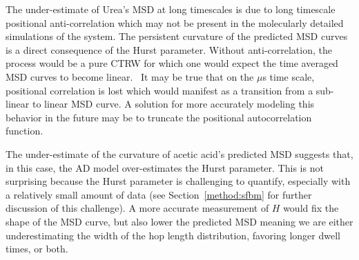 \documentclass{article}
\begin{document}
  The under-estimate of Urea's MSD at long timescales is due to long timescale
  positional anti-correlation which may not be present in the 
  molecularly detailed simulations of the 
  system. The 
  persistent curvature of the predicted MSD curves is a direct consequence of 
  the Hurst parameter. Without anti-correlation, the process would be 
  a pure CTRW for which one would expect the time averaged MSD curves to become 
  linear.~\cite{meroz_toolbox_2015} It may be true that on the $\mu$s time scale, 
  positional correlation is lost which would manifest as a transition from a sub-linear
  to linear MSD curve. A solution for more accurately modeling this behavior in  
  the future may be to truncate the positional autocorrelation function.~\cite{molina-garcia_crossover_2018}
  
  The under-estimate of the curvature of acetic acid's predicted MSD suggests that,
  in this case, the AD model over-estimates the Hurst parameter. This is not surprising
  because the Hurst parameter is challenging to quantify, especially with a relatively 
  small amount of data (see Section~\ref{method:sfbm} for further discussion of this 
  challenge). A more accurate measurement of $H$ would fix the shape of the MSD curve,
  but also lower the predicted MSD meaning we are either underestimating the width of
  the hop length distribution, favoring longer dwell times, or both.
  
  
  
  
\end{document}
